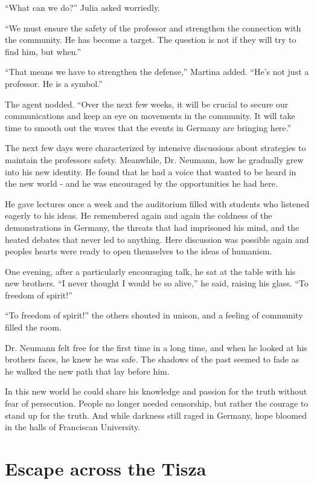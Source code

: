 \documentclass[
]{article}
\begin{document}
``What can we do?'' Julia asked worriedly.

``We must ensure the safety of the professor and strengthen the
connection with the community. He has become a target. The question is
not if they will try to find him, but when.''

``That means we have to strengthen the defense,'' Martina added. ``He's
not just a professor. He is a symbol.''

The agent nodded. ``Over the next few weeks, it will be crucial to
secure our communications and keep an eye on movements in the community.
It will take time to smooth out the waves that the events in Germany are
bringing here.''

The next few days were characterized by intensive discussions about
strategies to maintain the professor\textquotesingle s safety.
Meanwhile, Dr. Neumann, how he gradually grew into his new identity. He
found that he had a voice that wanted to be heard in the new world - and
he was encouraged by the opportunities he had here.

He gave lectures once a week and the auditorium filled with students who
listened eagerly to his ideas. He remembered again and again the
coldness of the demonstrations in Germany, the threats that had
imprisoned his mind, and the heated debates that never led to anything.
Here discussion was possible again and people\textquotesingle s hearts
were ready to open themselves to the ideas of humanism.

One evening, after a particularly encouraging talk, he sat at the table
with his new brothers. ``I never thought I would be so alive,'' he said,
raising his glass. ``To freedom of spirit!''

``To freedom of spirit!'' the others shouted in unison, and a feeling of
community filled the room.

Dr. Neumann felt free for the first time in a long time, and when he
looked at his brothers\textquotesingle{} faces, he knew he was safe. The
shadows of the past seemed to fade as he walked the new path that lay
before him.

In this new world he could share his knowledge and passion for the truth
without fear of persecution. People no longer needed censorship, but
rather the courage to stand up for the truth. And while darkness still
raged in Germany, hope bloomed in the halls of Franciscan University.

\section{Escape across the Tisza}\label{escape-across-the-tisza}
\end{document}
